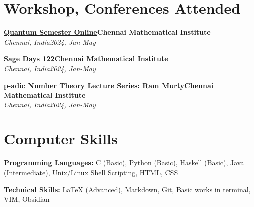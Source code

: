 \documentclass[letterpaper,10pt]{article}
\newcommand{\heading}[2]{
  \hspace{10pt}#1\hfill#2\\
}
\newcommand{\headingBf}[2]{
  \heading{\textbf{#1}}{\textbf{#2}}
}
\newcommand{\headingIt}[2]{
  \heading{\textit{#1}}{\textit{#2}}
}
\newenvironment{resume_list}{
  \vspace{-7pt}
  \begin{itemize}[itemsep=-2px, parsep=1pt, leftmargin=30pt]
}{
  \end{itemize}
}
\begin{document}
\section{Workshop, Conferences Attended}
\begin{resume_list}
	\item \headingBf{\href{https://www.cmi.ac.in/activities/kohli-centre/quantum-semester-2024/}{Quantum Semester Online}}{Chennai Mathematical Institute}
	\headingIt{Chennai, India}{2024, Jan-May}{}
	\item \headingBf{\href{https://www.cmi.ac.in/~mkummini/sagedays122/index.html}{Sage Days 122}}{Chennai Mathematical Institute}
	\headingIt{Chennai, India}{2024, Jan-May}{}
	\item \headingBf{\href{https://sohamch08.github.io/certificates_merged_SohamChatterjee.pdf}{p-adic Number Theory Lecture Series: Ram Murty}}{Chennai Mathematical Institute}
	\headingIt{Chennai, India}{2024, Jan-May}{}
\end{resume_list}



  \section{Computer Skills}

  
  \begin{resume_list}
    \item \textbf{Programming Languages:} C (Basic), Python (Basic), Haskell (Basic), Java (Intermediate), Unix/Linux
    Shell Scripting, HTML, CSS
    \item \textbf{Technical Skills:} LaTeX (Advanced), Markdown, Git, Basic works in terminal, VIM, Obsidian
  \end{resume_list}
\end{document}
